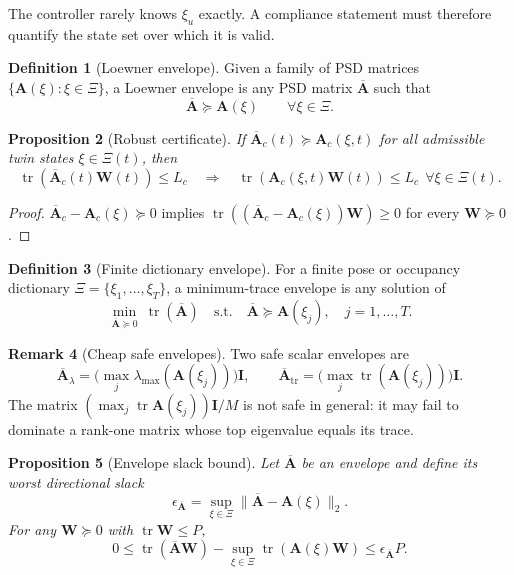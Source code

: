 \documentclass[11pt,a4paper]{article}
\theoremstyle{definition}
\newtheorem{definition}{Definition}[section]
\newtheorem{remark}[definition]{Remark}
\theoremstyle{plain}
\newtheorem{proposition}[definition]{Proposition}
\newcommand{\W}{\mathbf W}
\newcommand{\A}{\mathbf A}
\newcommand{\Abar}{\overline{\mathbf A}}
\newcommand{\Id}{\mathbf I}
\newcommand{\tr}{\operatorname{tr}}
\begin{document}
The controller rarely knows $\xi_u$ exactly.  A compliance statement must
therefore quantify the state set over which it is valid.

\begin{definition}[Loewner envelope]
Given a family of PSD matrices
$\{\A(\xi):\xi\in\Xi\}$, a Loewner envelope is any PSD matrix $\Abar$
such that
\begin{equation}
  \Abar\succeq \A(\xi)\qquad\forall\xi\in\Xi.
\end{equation}
\end{definition}

\begin{proposition}[Robust certificate]\label{prop:robust-certificate}
If $\Abar_c(t)\succeq \A_c(\xi,t)$ for all admissible twin states
$\xi\in\Xi(t)$, then
\begin{equation}\label{eq:robust-cert}
  \tr(\Abar_c(t)\W(t))\le L_c
  \quad\Longrightarrow\quad
  \tr(\A_c(\xi,t)\W(t))\le L_c
  \ \ \forall\xi\in\Xi(t).
\end{equation}
\end{proposition}

\begin{proof}
$\Abar_c-\A_c(\xi)\succeq0$ implies
$\tr((\Abar_c-\A_c(\xi))\W)\ge0$ for every $\W\succeq0$.
\end{proof}

\begin{definition}[Finite dictionary envelope]
For a finite pose or occupancy dictionary
$\Xi=\{\xi_1,\ldots,\xi_T\}$, a minimum-trace envelope is any solution of
\begin{equation}\label{eq:envelope-sdp}
  \min_{\Abar\succeq0}\ \tr(\Abar)
  \quad\text{s.t.}\quad
  \Abar\succeq \A(\xi_j),\quad j=1,\ldots,T.
\end{equation}
\end{definition}

\begin{remark}[Cheap safe envelopes]
Two safe scalar envelopes are
\begin{equation}
  \Abar_{\lambda}=\bigl(\max_j\lambda_{\max}(\A(\xi_j))\bigr)\Id,
  \qquad
  \Abar_{\tr}=\bigl(\max_j\tr(\A(\xi_j))\bigr)\Id.
\end{equation}
The matrix $(\max_j\tr\A(\xi_j))\Id/M$ is not safe in general: it may
fail to dominate a rank-one matrix whose top eigenvalue equals its trace.
\end{remark}

\begin{proposition}[Envelope slack bound]\label{prop:slack}
Let $\Abar$ be an envelope and define its worst directional slack
\begin{equation}
  \epsilon_{\Abar}
  =\sup_{\xi\in\Xi}\|\Abar-\A(\xi)\|_2.
\end{equation}
For any $\W\succeq0$ with $\tr\W\le P$,
\begin{equation}
  0\le \tr(\Abar\W)-\sup_{\xi\in\Xi}\tr(\A(\xi)\W)
  \le \epsilon_{\Abar}P.
\end{equation}
\end{proposition}
\end{document}
